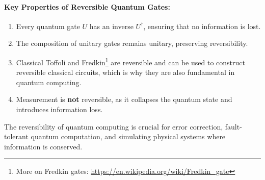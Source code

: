
\paragraph{Key Properties of Reversible Quantum Gates:}
\begin{enumerate}
  \item Every quantum gate \( U \) has an inverse \( U^\dagger \), ensuring
    that no information is lost.
  \item The composition of unitary gates remains unitary, preserving
    reversibility.
  \item Classical Toffoli and Fredkin\footnote{More on Fredkin gates: \url{https://en.wikipedia.org/wiki/Fredkin_gate}}
    are reversible and can be used to construct reversible classical circuits,
    which is why they are also fundamental in quantum computing.
  \item Measurement is \textbf{not} reversible, as it collapses the quantum
    state and introduces information loss.
\end{enumerate}

The reversibility of quantum computing is crucial for error correction,
fault-tolerant quantum computation, and simulating physical systems where
information is conserved.




